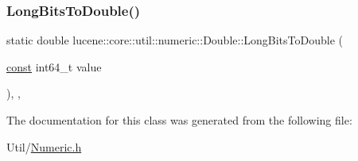 \mbox{\label{classlucene_1_1core_1_1util_1_1numeric_1_1Double_adf20eb260f0f99ef904e88be601b15f5}} 
\subsubsection{\texorpdfstring{Long\+Bits\+To\+Double()}{LongBitsToDouble()}}
{\footnotesize\ttfamily static double lucene\+::core\+::util\+::numeric\+::\+Double\+::\+Long\+Bits\+To\+Double (\begin{DoxyParamCaption}\item[{\mbox{\hyperlink{ZlibCrc32_8h_a2c212835823e3c54a8ab6d95c652660e}{const}} int64\+\_\+t}]{value }\end{DoxyParamCaption})\hspace{0.3cm}{\ttfamily [inline]}, {\ttfamily [static]}, {\ttfamily [noexcept]}}



The documentation for this class was generated from the following file\+:\begin{DoxyCompactItemize}
\item 
Util/\mbox{\hyperlink{Numeric_8h}{Numeric.\+h}}\end{DoxyCompactItemize}
